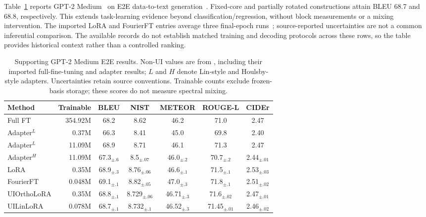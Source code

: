 \documentclass{article}
\begin{document}
Table~\ref{tab:gpt2_generation_appendix} reports GPT-2 Medium~\citep{radford2019language} on E2E data-to-text generation~\citep{novikova2017e2e}. Fixed-core and partially rotated constructions attain BLEU 68.7 and 68.8, respectively. This extends task-learning evidence beyond classification/regression, without block measurements or a mixing intervention. The imported LoRA and FourierFT entries average three final-epoch runs~\citep{gao2024parameter}; source-reported uncertainties are not a common inferential comparison. The available records do not establish matched training and decoding protocols across these rows, so the table provides historical context rather than a controlled ranking.
\begin{table}[ht]
\centering
\caption{Supporting GPT-2 Medium E2E results. Non-UI values are from \citet{gao2024parameter}, including their imported full-fine-tuning and adapter results; $L$ and $H$ denote Lin-style and Houlsby-style adapters. Uncertainties retain source conventions. Trainable counts exclude frozen-basis storage; these scores do not measure spectral mixing.}
\label{tab:gpt2_generation_appendix}
\begin{adjustbox}{max width=\linewidth}
\begin{tabular}{@{}l r c c c c c@{}}
\toprule
\textbf{Method} & \textbf{Trainable} & \textbf{BLEU} & \textbf{NIST} & \textbf{METEOR} & \textbf{ROUGE-L} & \textbf{CIDEr} \\
\midrule
Full FT          & 354.92M & 68.2           & 8.62           & 46.2           & 71.0           & 2.47 \\
Adapter$^L$      & 0.37M   & 66.3           & 8.41           & 45.0           & 69.8           & 2.40 \\
Adapter$^L$      & 11.09M  & 68.9           & 8.71           & 46.1           & 71.3           & 2.47 \\
Adapter$^H$      & 11.09M  & 67.3$_{\pm.6}$ & 8.5$_{\pm.07}$ & 46.0$_{\pm.2}$ & 70.7$_{\pm.2}$ & 2.44$_{\pm.01}$ \\
LoRA             & 0.35M   & 68.9$_{\pm.3}$  & 8.76$_{\pm.06}$ & 46.6$_{\pm.1}$ & 71.5$_{\pm.1}$ & 2.53$_{\pm.03}$ \\
FourierFT     & 0.048M  & 69.1$_{\pm.1}$ & 8.82$_{\pm.05}$ & 47.0$_{\pm.3}$ & 71.8$_{\pm.1}$ & 2.51$_{\pm.02}$ \\
UIOrthoLoRA   & 0.35M   & 68.8$_{\pm.1}$ & 8.729$_{\pm.06}$ & 46.71$_{\pm.3}$ & 71.6$_{\pm.02}$ & 2.47$_{\pm.01}$ \\
UILinLoRA     & 0.078M  & 68.7$_{\pm.1}$ & 8.732$_{\pm.1}$ & 46.52$_{\pm.3}$ & 71.45$_{\pm.01}$ & 2.46$_{\pm.02}$ \\
\bottomrule
\end{tabular}
\end{adjustbox}
\end{table}
\end{document}
